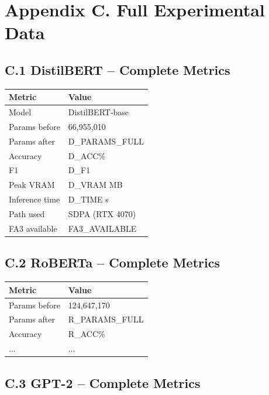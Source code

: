 \section{Appendix C. Full Experimental Data}

\subsection{C.1 DistilBERT -- Complete Metrics}

\begin{table}[H]
\centering
\small
\begin{tabular}{ll}
\toprule
\textbf{Metric} & \textbf{Value} \\
\midrule
Model & DistilBERT-base \\
Params before & 66,955,010 \\
Params after & {{D\_PARAMS\_FULL}} \\
Accuracy & {{D\_ACC}}\% \\
F1 & {{D\_F1}} \\
Peak VRAM & {{D\_VRAM}} MB \\
Inference time & {{D\_TIME}} s \\
Path used & SDPA (RTX 4070) \\
FA3 available & {{FA3\_AVAILABLE}} \\
\bottomrule
\end{tabular}
\end{table}

\subsection{C.2 RoBERTa -- Complete Metrics}

\begin{table}[H]
\centering
\small
\begin{tabular}{ll}
\toprule
\textbf{Metric} & \textbf{Value} \\
\midrule
Params before & 124,647,170 \\
Params after & {{R\_PARAMS\_FULL}} \\
Accuracy & {{R\_ACC}}\% \\
... & ... \\
\bottomrule
\end{tabular}
\end{table}

\subsection{C.3 GPT-2 -- Complete Metrics}

